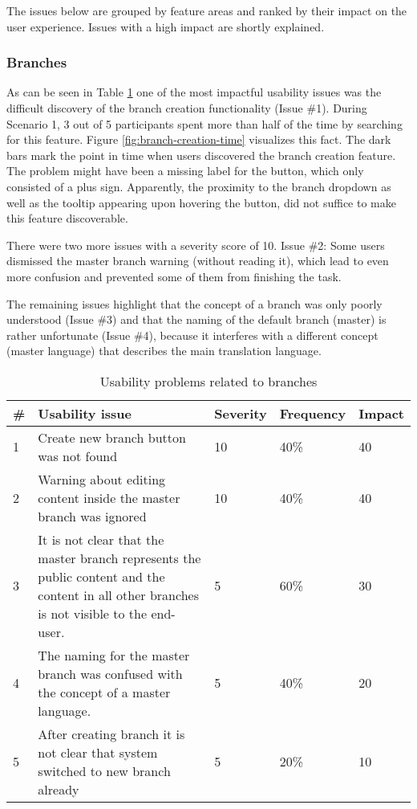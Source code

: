 The issues below are grouped by feature areas and ranked by their impact on the user experience. Issues with a high impact are shortly explained.

\subsubsection{Branches}
As can be seen in Table \ref{table:issues-branches} one of the most impactful usability issues was the difficult discovery of the branch creation functionality (Issue \#1). During Scenario 1, 3 out of 5 participants spent more than half of the time by searching for this feature. Figure \ref{fig:branch-creation-time} visualizes this fact. The dark bars mark the point in time when users discovered the branch creation feature. The problem might have been a missing label for the button, which only consisted of a plus sign. Apparently, the proximity to the branch dropdown as well as the tooltip appearing upon hovering the button, did not suffice to make this feature discoverable.

There were two more issues with a severity score of 10. Issue \#2: Some users dismissed the master branch warning (without reading it), which lead to even more confusion and prevented some of them from finishing the task.

The remaining issues highlight that the concept of a branch was only poorly understood (Issue \#3) and that the naming of the default branch (master) is rather unfortunate (Issue \#4), because it interferes with a different concept (master language) that describes the main translation language.

\begin{table}[h!]
\centering
\begin{tabular}{|l|p{7cm}|l|l|l|}
\hline
\rowcolor[HTML]{EFEFEF}
\textbf{\#} & \textbf{Usability issue} & \textbf{Severity} & \textbf{Frequency} & \textbf{Impact} \\ \hline
1 & Create new branch button was not found & 10 & 40\% & 40 \\ \hline
2 & Warning about editing content inside the master branch was ignored & 10 & 40\% & 40 \\ \hline
3 & It is not clear that the master branch represents the public content and the content in all other branches is not visible to the end-user. & 5 & 60\% & 30 \\ \hline
4 & The naming for the master branch was confused with the concept of a master language. & 5 & 40\% & 20 \\ \hline
5 & After creating branch it is not clear that system switched to new branch already & 5 & 20\% & 10 \\ \hline
\end{tabular}
\caption{Usability problems related to branches}
\label{table:issues-branches}
\end{table}

